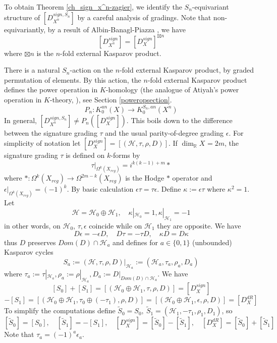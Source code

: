 \documentclass[11pt,leqno,twoside]{amsart}
\theoremstyle{plainsl}
\theoremstyle{definition}
\newcommand{\R}{\mathbb{R}}
\newcommand{\cH}{\mathcal{H}}
\begin{document}
To obtain Theorem \ref{ch_sign_x^n-zagier}, we identify the $S_n$-equivariant structure of $\left[D^{sign,S_n}_{X^n}\right]$ by a careful analysis of gradings. Note that non-equivariantly, by a result of Albin-Banagl-Piazza \cite{ABP1}, we have
 \[[D^{sign}_{X^n}]=[D^{sign}_{X}]^{\boxtimes n}\]
  where $\boxtimes n$ is the $n$-fold external Kasparov product.



There is a natural $S_n$-action on the $n$-fold external Kasparov product, by graded permutation of elements. By this action, the $n$-fold external Kasparov product defines the power operation in $K$-homology (the analogue of Atiyah's power operation in $K$-theory, \cite{At}), see Section \ref{poweropsection}.
\begin{equation}\label{intropower}
    P_n:K^{an}_0(X)\rightarrow K_0^{S_n,an}(X^n)
\end{equation}
In general, 
$
    [D^{sign,S_n}_{X^n}] \not = P_n([D^{sign}_{X}])
$.
This boils down to the difference between the signature grading $\tau$ and the usual parity-of-degree grading $\epsilon$. For simplicity of notation let
 $ \left[D_X^{sign}\right]=[(\mathcal{H},
\tau,\rho,
D)]$.
If $\dim_{\R} X_{}=2m$, the signature grading  $\tau$ is defined on $k$-forms by \cite{AS3}
 \begin{equation}\label{siggradingdef}
     \tau|_{\Omega^k(X_{reg})}=i^{k(k-1)+m}\ast
 \end{equation}
 where $\ast:\Omega^k(X_{reg})\rightarrow \Omega^{2m-k}(X_{reg})$ is the Hodge $\ast$ operator and $\epsilon|_{\Omega^k(X_{reg})}=(-1)^k$. By basic calculation
 $\epsilon \tau=\tau\epsilon$. Define
 $\kappa:=\epsilon \tau$ where  $\kappa^2=1$.
 Let \[\mathcal{H}=\mathcal{H}_{0} \oplus \mathcal{H}_{1}, \quad \kappa|_{\mathcal{H}_{0}}=1, \kappa|_{\mathcal{H}_{1}}=-1\] in other words, on $\mathcal{H}_{0}$, $\tau, \epsilon$ coincide while on $\mathcal{H}_{1}$ they are opposite. We have $$D\epsilon=-\epsilon D,\quad D\tau=-\tau D,\quad \kappa D=D\kappa$$ thus $D$ preserves $Dom(D)\cap \mathcal{H}_{a}$ and defines for $a\in \{0,1\}$ (unbounded) Kasparov cycles
 \[S_a:=(\mathcal{H},
\tau,\rho,
D)|_{\mathcal{H}_{a}}:=(\cH_a,\tau_a,\rho_a,D_a)\]
where $\tau_a:=\tau|_{\cH_a}, \rho_a:=\rho|_{\cH_a}, D_a:=D|_{Dom(D)\cap \cH_a}$.  We have
\[[S_0]+[S_1]=\left[(\cH_0 \oplus \cH_1,\tau,\rho, D) \right]=[D^{sign}_{X}]\]
\begin{equation}
    [S_0]-[S_1]=\left[(\cH_0 \oplus \cH_1,\tau_0 \oplus (-\tau_1),\rho, D )\right]=\left[(\cH_0 \oplus \cH_1,\epsilon,\rho, D) \right]=[D^{dR}_{X}]
\end{equation}
To simplify the computations define $\widetilde S_0=S_0,~ {\widetilde S_1}=(\cH_1,-\tau_1,\rho_1,D_1)$, so $$[\tilde{S}_0]=[S_0],\quad[\widetilde S_1]=-[S_1],\quad  [D^{sign}_{X}]=[\widetilde S_0] -[\widetilde S_1],\quad [D^{dR}_{X}]=[\widetilde S_0] +[\widetilde S_1] $$
Note that  $\tau_a=(-1)^a\epsilon_a$.
\end{document}
